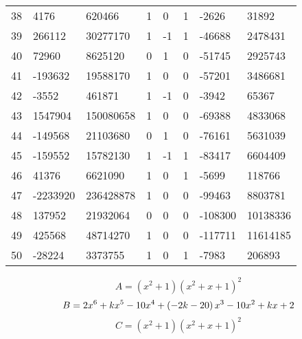 \documentclass{amsart}
\begin{document}
\begin{longtable}{|l|l|l|lllll|}
38&4176&620466&1&0&1&-2626&31892\\
39&266112&30277170&1&-1&1&-46688&2478431\\
40&72960&8625120&0&1&0&-51745&2925743\\
41&-193632&19588170&1&0&0&-57201&3486681\\
42&-3552&461871&1&-1&0&-3942&65367\\
43&1547904&150080658&1&0&0&-69388&4833068\\
44&-149568&21103680&0&1&0&-76161&5631039\\
45&-159552&15782130&1&-1&1&-83417&6604409\\
46&41376&6621090&1&0&1&-5699&118766\\
47&-2233920&236428878&1&0&0&-99463&8803781\\
48&137952&21932064&0&0&0&-108300&10138336\\
49&425568&48714270&1&0&0&-117711&11614185\\
50&-28224&3373755&1&0&1&-7983&206893\\
\hline
\end{longtable}
$$A=(x^2
 + 1)(x^2
 + x
 + 1)^{2}$$
$$B=2\*x^6
 + k\*x^5
 - 10\*x^4
 + \left(-2\*k
 - 20\right) \*x^3
 - 10\*x^2
 + k\*x
 + 2$$
$$C=(x^2
 + 1)(x^2
 + x
 + 1)^{2}$$
\end{document}
